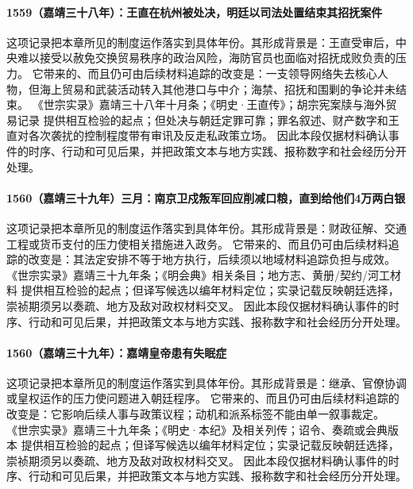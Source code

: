 \paragraph{1559（嘉靖三十八年）：王直在杭州被处决，明廷以司法处置结束其招抚案件} 这项记录把本章所见的制度运作落实到具体年份。其形成背景是：王直受审后，中央难以接受以赦免交换贸易秩序的政治风险，海防官员也面临对招抚成败负责的压力。 它带来的、而且仍可由后续材料追踪的改变是：一支领导网络失去核心人物，但海上贸易和武装活动转入其他港口与中介；海禁、招抚和围剿的争论并未结束。 《世宗实录》嘉靖三十八年十月条；《明史·王直传》；胡宗宪案牍与海外贸易记录 提供相互检验的起点；但处决与朝廷定罪可靠；罪名叙述、财产数字和王直对各次袭扰的控制程度带有审讯及反走私政策立场。 因此本段仅据材料确认事件的时序、行动和可见后果，并把政策文本与地方实践、报称数字和社会经历分开处理。

\paragraph{1560（嘉靖三十九年）三月：南京卫戍叛军回应削减口粮，直到给他们4万两白银} 这项记录把本章所见的制度运作落实到具体年份。其形成背景是：财政征解、交通工程或货币支付的压力使相关措施进入政务。 它带来的、而且仍可由后续材料追踪的改变是：其法定安排不等于地方执行，后续须以地域材料追踪负担与成效。 《世宗实录》嘉靖三十九年条；《明会典》相关条目；地方志、黄册/契约/河工材料 提供相互检验的起点；但译写候选以编年材料定位；实录记载反映朝廷选择，崇祯期须另以奏疏、地方及敌对政权材料交叉。 因此本段仅据材料确认事件的时序、行动和可见后果，并把政策文本与地方实践、报称数字和社会经历分开处理。

\paragraph{1560（嘉靖三十九年）：嘉靖皇帝患有失眠症} 这项记录把本章所见的制度运作落实到具体年份。其形成背景是：继承、官僚协调或皇权运作的压力使问题进入朝廷程序。 它带来的、而且仍可由后续材料追踪的改变是：它影响后续人事与政策议程；动机和派系标签不能由单一叙事裁定。 《世宗实录》嘉靖三十九年条；《明史·本纪》及相关列传；诏令、奏疏或会典版本 提供相互检验的起点；但译写候选以编年材料定位；实录记载反映朝廷选择，崇祯期须另以奏疏、地方及敌对政权材料交叉。 因此本段仅据材料确认事件的时序、行动和可见后果，并把政策文本与地方实践、报称数字和社会经历分开处理。


